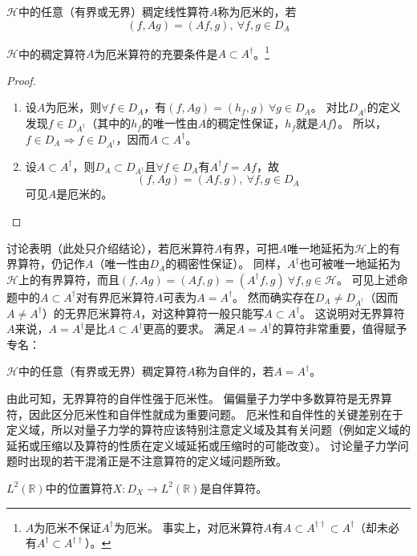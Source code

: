 \begin{definition}
    $\mathscr{H}$中的任意（有界或无界）稠定线性算符$A$称为厄米的，若
    $$(f, Ag) = (Af, g), ~ \forall f, g \in D_A$$
\end{definition}

\begin{theorem}
    $\mathscr{H}$中的稠定算符$A$为厄米算符的充要条件是$A \subset A^\dagger$。\footnote{
        $A$为厄米不保证$A^\dagger$为厄米。
        事实上，对厄米算符$A$有$A \subset A^{\dagger\dagger} \subset A^\dagger$（却未必有$A^\dagger \subset A^{\dagger\dagger}$）。
    }
\end{theorem}

\begin{proof}
    \begin{enumerate}[（A）]
        \item 设$A$为厄米，则$\forall f \in D_A$，有$(f, Ag) = (h_f, g) ~ \forall g \in D_A$。
        对比$D_{A^\dagger}$的定义发现$f \in D_{A^\dagger}$（其中的$h_f$的唯一性由$A$的稠定性保证，$h_f$就是$Af$）。
        所以，$f \in D_A \Rightarrow f \in D_{A^\dagger}$，因而$A \subset A^\dagger$。
        \item 设$A \subset A^\dagger$，则$D_A \subset D_{A^\dagger}$且$\forall f \in D_A$有$A^\dagger f = Af$，故
        $$(f, Ag) = (Af, g), ~ \forall f, g \in D_A$$
        可见$A$是厄米的。
    \end{enumerate}
\end{proof}

\begin{note}
    讨论表明（此处只介绍结论），若厄米算符$A$有界，可把$A$唯一地延拓为$\mathscr{H}$上的有界算符，仍记作$A$（唯一性由$D_A$的稠密性保证）。
    同样，$A^\dagger$也可被唯一地延拓为$\mathscr{H}$上的有界算符，而且$(f, Ag) = (Af, g) = (A^\dagger f, g) ~ \forall f, g \in \mathscr{H}$。
    可见上述命题中的$A \subset A^\dagger$对有界厄米算符$A$可表为$A = A^\dagger$。
    然而确实存在$D_A \neq D_{A^\dagger}$（因而$A \neq A^\dagger$）的无界厄米算符$A$，对这种算符一般只能写$A \subset A^\dagger$。
    这说明对无界算符$A$来说，$A = A^\dagger$是比$A \subset A^\dagger$更高的要求。
    满足$A = A^\dagger$的算符非常重要，值得赋予专名：
\end{note}

\begin{definition}
    $\mathscr{H}$中的任意（有界或无界）稠定算符$A$称为自伴的，若$A = A^\dagger$。
\end{definition}

由此可知，无界算符的自伴性强于厄米性。
偏偏量子力学中多数算符是无界算符，因此区分厄米性和自伴性就成为重要问题。
厄米性和自伴性的关键差别在于定义域，所以对量子力学的算符应该特别注意定义域及其有关问题（例如定义域的延拓或压缩以及算符的性质在定义域延拓或压缩时的可能改变）。
讨论量子力学问题时出现的若干混淆正是不注意算符的定义域问题所致。

\begin{theorem}
    $L^2(\mathbb{R})$中的位置算符$X \colon D_X \to L^2(\mathbb{R})$是自伴算符。
\end{theorem}


